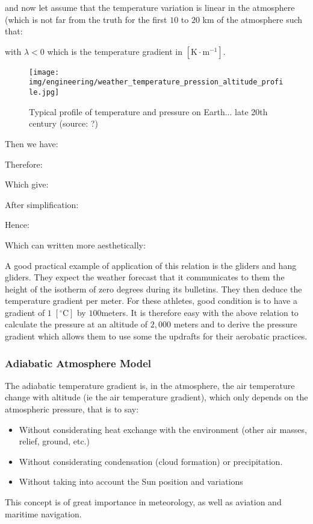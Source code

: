 	and now let assume that the temperature variation is linear in the atmosphere (which is not far from the truth for the first $10$ to $20$ km of the atmosphere such that:
	
	with $\lambda<0$ which is the temperature gradient in $[\text{K}\cdot\text{m}^{-1}]$.
	\begin{figure}[H]
		\begin{center}
			\texttt{[image: img/engineering/weather\_temperature\_pression\_altitude\_profile.jpg]}
		\end{center}	
		\caption{Typical profile of temperature and pressure on Earth... late 20th century (source: ?)}
	\end{figure}
	Then we have:
	
	Therefore:
	
	Which give:
	
	After simplification:
	
	Hence:
	
	Which can written more aesthetically:
	
	A good practical example of application of this relation is the gliders and hang gliders. They expect the weather forecast that it communicates to them the height of the isotherm of zero degrees during its bulletins. They then deduce the temperature gradient per meter. For these athletes, good condition is to have a gradient of $1\;[^\circ \text{C}]$ by $100 $meters. It is therefore easy with the above relation to calculate the pressure at an altitude of $2,000$ meters and to derive the pressure gradient which allows them to use some the updrafts for their aerobatic practices.
	
	\subsubsection{Adiabatic Atmosphere Model}
	The adiabatic temperature gradient is, in the atmosphere, the air temperature change with altitude (ie the air temperature gradient), which only depends on the atmospheric pressure, that is to say:
	\begin{itemize}
		\item Without considerating heat exchange with the environment (other air masses, relief, ground, etc.)

		\item  Without considerating condensation (cloud formation) or precipitation.
	
		\item Without taking into account the Sun position and variations
	\end{itemize}
	This concept is of great importance in meteorology, as well as aviation and maritime navigation.

